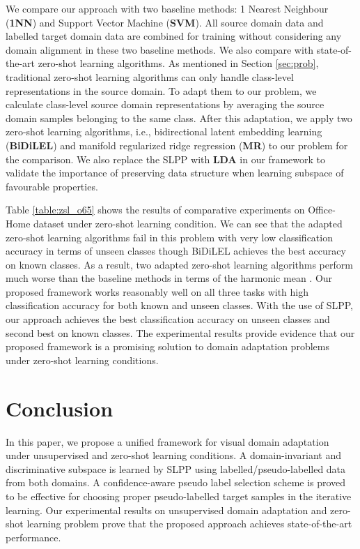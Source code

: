 \documentclass[conference]{IEEEtran}
\begin{document}
We compare our approach with two baseline methods: 1 Nearest Neighbour (\textbf{1NN}) and Support Vector Machine (\textbf{SVM}). All source domain data and labelled target domain data are combined for training without considering any domain alignment in these two baseline methods. We also compare with state-of-the-art zero-shot learning algorithms. As mentioned in Section \ref{sec:prob}, traditional zero-shot learning algorithms can only handle class-level representations in the source domain. To adapt them to our problem, we calculate class-level source domain representations by averaging the source domain samples belonging to the same class. After this adaptation, we apply two zero-shot learning algorithms, i.e., bidirectional latent embedding learning (\textbf{BiDiLEL}) \cite{wang2017zero} and manifold regularized ridge regression (\textbf{MR}) \cite{xu2017transductive} to our problem for the comparison. We also replace the SLPP with \textbf{LDA} in our framework to validate the importance of preserving data structure when learning subspace of favourable properties.

Table \ref{table:zsl_o65} shows the results of comparative experiments on Office-Home dataset under zero-shot learning condition. We can see that the adapted zero-shot learning algorithms fail in this problem with very low classification accuracy in terms of unseen classes though BiDiLEL achieves the best accuracy on known classes. As a result, two adapted zero-shot learning algorithms perform much worse than the baseline methods in terms of the harmonic mean . Our proposed framework works reasonably well on all three tasks with high classification accuracy for both known and unseen classes. With the use of SLPP, our approach achieves the best classification accuracy on unseen classes and second best on known classes. The experimental results provide evidence that our proposed framework is a promising solution to domain adaptation problems under zero-shot learning conditions.
\section{Conclusion}
In this paper, we propose a unified framework for visual domain adaptation under unsupervised and zero-shot learning conditions. A domain-invariant and discriminative subspace is learned by SLPP using labelled/pseudo-labelled data from both domains. A confidence-aware pseudo label selection scheme is proved to be effective for choosing proper pseudo-labelled target samples in the iterative learning. Our experimental results on unsupervised domain adaptation and zero-shot learning problem prove that the proposed approach achieves state-of-the-art performance.


\end{document}

